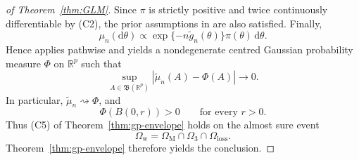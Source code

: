 \documentclass[11pt]{article}
\theoremstyle{plain}
\theoremstyle{definition}
\theoremstyle{remark}
\begin{document}
\begin{proof}[of Theorem~\ref{thm:GLM}]
Since $\pi$ is strictly positive and twice continuously differentiable
by {(C2)}, the prior assumptions in \citet[Thm.~4]{miller2021generalized_posteriors}
are also satisfied. Finally,
\[
\mu_{n}(\mathrm{d}\theta)\propto\exp\{-n\tilde{g}_{n}(\theta)\}\pi(\theta)\,\mathrm{d}\theta.
\]
Hence \citet[Thm.~4]{miller2021generalized_posteriors} applies pathwise
and yields a nondegenerate centred Gaussian probability measure $\Phi$
on $\mathbb{R}^{p}$ such that
\[
\sup_{A\in\mathfrak{B}(\mathbb{R}^{p})}\left|\tilde\mu_n(A)-\Phi(A)\right|\to0.
\]
In particular, $\tilde\mu_n\rightsquigarrow\Phi$, and
\[
\Phi\left(B(0,r)\right)>0\qquad\text{for every }r>0.
\]
Thus {(C5)} of Theorem~\ref{thm:gp-envelope} holds on the almost
sure event
\[
\Omega_{\mathrm{w}}=\Omega_{\mathrm{M}}\cap\Omega_{3}\cap\Omega_{\mathrm{loss}}.
\]
Theorem~\ref{thm:gp-envelope} therefore yields the
conclusion.
\end{proof}
\end{document}
